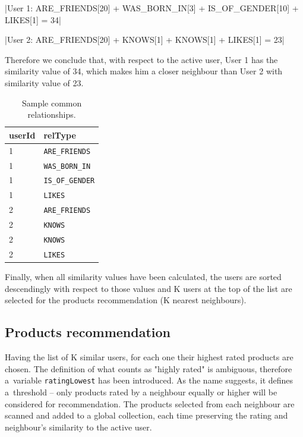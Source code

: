 \documentclass[12pt]{report}
\begin{document}
|User 1: ARE_FRIENDS[20] + WAS_BORN_IN[3] + IS_OF_GENDER[10] + LIKES[1] = 34|

|User 2: ARE_FRIENDS[20] + KNOWS[1] + KNOWS[1] + LIKES[1] = 23|

Therefore we conclude that, with respect to the active user, User 1 has the similarity value of 34, which makes him a closer neighbour than User 2 with similarity value of 23.

\begin{table}[!h]
\centering
\caption{Sample common relationships.}
\label{table.sample_rels}
\vspace{3mm}
\begin{tabular}{ll}
\hline
userId         & relType \vspace{2mm} \\ \hline
1       & \texttt{ARE\_FRIENDS}                  \\ 
1       & \texttt{WAS\_BORN\_IN}              \\
1       & \texttt{IS\_OF\_GENDER}       \\
1       & \texttt{LIKES}      \\
2       & \texttt{ARE\_FRIENDS}          \\
2       & \texttt{KNOWS}       \\
2       & \texttt{KNOWS}            \\
2       & \texttt{LIKES}              \vspace{2mm} \\ \hline
\end{tabular}
\end{table}

Finally, when all similarity values have been calculated, the users are sorted descendingly with respect to those values and K users at the top of the list are selected for the products recommendation (K nearest neighbours).

\subsection{Products recommendation}

Having the list of K similar users, for each one their highest rated products are chosen. The definition of what counts as "highly rated" is ambiguous, therefore a~variable \texttt{ratingLowest} has been introduced. As the name suggests, it defines a~threshold -- only products rated by a neighbour equally or higher will be considered for recommendation. The products selected from each neighbour are scanned and added to a global collection, each time preserving the rating and neighbour's similarity to the active user.
\end{document}
